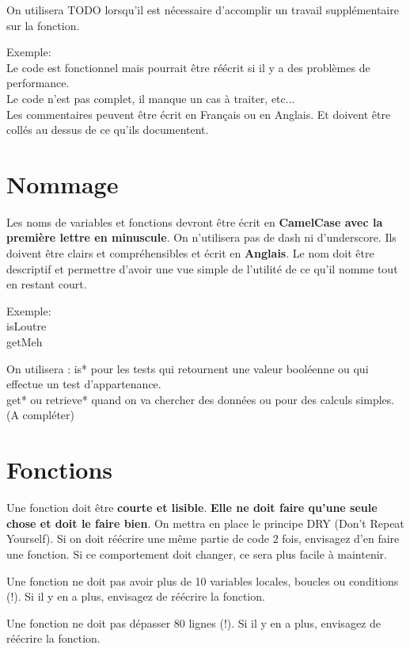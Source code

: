 \documentclass[a4paper, titlepage, oneside]{book}
\begin{document}
On utilisera TODO lorsqu'il est nécessaire d'accomplir un travail supplémentaire sur la fonction.

Exemple:\\
Le code est fonctionnel mais pourrait être réécrit si il y a des problèmes de performance.\\
Le code n'est pas complet, il manque un cas à traiter, etc... \\

Les commentaires peuvent être écrit en Français ou en Anglais. Et doivent être collés au dessus de ce qu'ils documentent.

\chapter{Nommage}

Les noms de variables et fonctions devront être écrit en \textbf{CamelCase avec la première lettre en minuscule}. On n'utilisera pas de dash ni d'underscore. Ils doivent être clairs et compréhensibles et écrit en \textbf{Anglais}. Le nom doit être descriptif et permettre d'avoir une vue simple de l'utilité de ce qu'il nomme tout en restant court.

Exemple:\\
isLoutre\\
getMeh

On utilisera :
is* pour les tests qui retournent une valeur booléenne ou qui effectue un test d'appartenance.\\
get* ou retrieve* quand on va chercher des données ou pour des calculs simples.\\

(A compléter)

\chapter{Fonctions}

Une fonction doit être \textbf{courte et lisible}. \textbf{Elle ne doit faire qu'une seule chose et doit le faire bien}. On mettra en place le principe DRY (Don't Repeat Yourself). Si on doit réécrire une même partie de code 2 fois, envisagez d'en faire une fonction. Si ce comportement doit changer, ce sera plus facile à maintenir.

Une fonction ne doit pas avoir plus de 10 variables locales, boucles ou conditions (!). Si il y en a plus, envisagez de réécrire la fonction.

Une fonction ne doit pas dépasser 80 lignes (!). Si il y en a plus, envisagez de réécrire la fonction.
\end{document}
